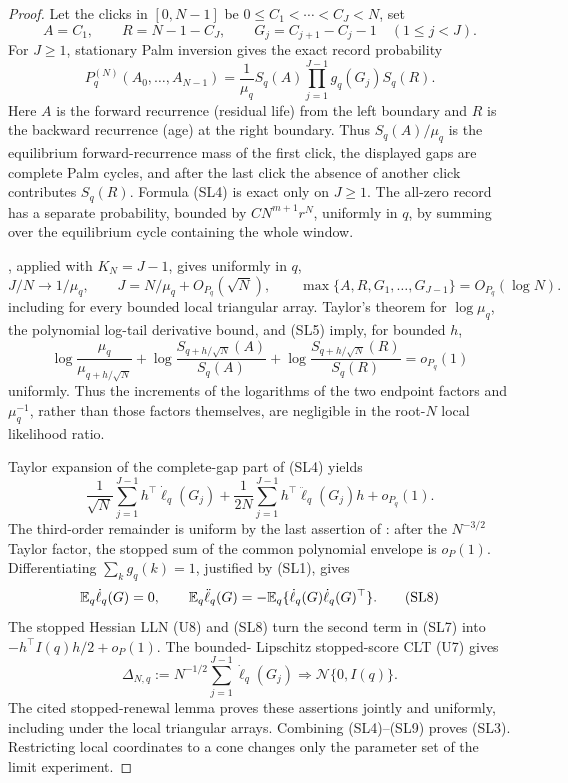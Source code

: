 \begin{proof}
Let the clicks in \([0,N-1]\) be
\(0\le C_1<\cdots<C_J<N\), set
\[
 A=C_1,\qquad R=N-1-C_J,
 \qquad G_j=C_{j+1}-C_j-1\quad(1\le j<J).
\]
For \(J\ge1\), stationary Palm inversion gives the exact record probability
\[
 P_q^{(N)}(A_0,\ldots,A_{N-1})
 =\frac1{\mu_q}S_q(A)
   \prod_{j=1}^{J-1}g_q(G_j)S_q(R).
\tag{SL4}
\]
Here \(A\) is the forward recurrence (residual life) from the left boundary
and \(R\) is the backward recurrence (age) at the right boundary.  Thus
\(S_q(A)/\mu_q\) is the equilibrium forward-recurrence mass of the first
click, the displayed gaps are complete Palm cycles, and after the last click
the absence of another click contributes \(S_q(R)\).  Formula
\textup{(SL4)} is exact only on \(J\ge1\).  The all-zero record has a separate
probability, bounded by \(CN^{m+1}r^N\), uniformly in \(q\), by summing over
the equilibrium cycle containing the whole window.

, applied with
\(K_N=J-1\), gives uniformly in \(q\),
\[
 J/N\longrightarrow1/\mu_q,\qquad
 J=N/\mu_q+O_{P_q}(\sqrt N),\qquad
 \max\{A,R,G_1,\ldots,G_{J-1}\}=O_{P_q}(\log N).
\tag{SL5}
\]
including for every bounded local triangular array.  Taylor's theorem for
\(\log\mu_q\), the polynomial log-tail derivative bound, and
\textup{(SL5)} imply, for bounded \(h\),
\[
 \log\frac{\mu_q}{\mu_{q+h/\sqrt N}}
 +\log\frac{S_{q+h/\sqrt N}(A)}{S_q(A)}
 +\log\frac{S_{q+h/\sqrt N}(R)}{S_q(R)}=o_{P_q}(1)
\tag{SL6}
\]
uniformly.  Thus the increments of the logarithms of the two endpoint factors
and \(\mu_q^{-1}\), rather than those factors themselves, are negligible in
the root-\(N\) local likelihood ratio.

Taylor expansion of the complete-gap part of \textup{(SL4)} yields
\[
 \frac1{\sqrt N}\sum_{j=1}^{J-1}h^\top\dot\ell_q(G_j)
 +\frac1{2N}\sum_{j=1}^{J-1}
 h^\top\ddot\ell_q(G_j)h+o_{P_q}(1).
\tag{SL7}
\]
The third-order remainder is uniform by the last assertion of
: after the \(N^{-3/2}\)
Taylor factor, the stopped sum of the common polynomial envelope is
\(o_P(1)\).
Differentiating \(\sum_kg_q(k)=1\), justified by \textup{(SL1)}, gives
\[
 \mathbb{E}_q\dot\ell_q(G)=0,\qquad
 \mathbb{E}_q\ddot\ell_q(G)=-\mathbb{E}_q\{
 \dot\ell_q(G)\dot\ell_q(G)^\top\}.
\tag{SL8}
\]
The stopped Hessian LLN \textup{(U8)} and \textup{(SL8)} turn the second
term in \textup{(SL7)} into \(-h^\top I(q)h/2+o_P(1)\).  The bounded-
Lipschitz stopped-score CLT \textup{(U7)} gives
\[
 \Delta_{N,q}:=N^{-1/2}\sum_{j=1}^{J-1}\dot\ell_q(G_j)
 \Rightarrow\mathcal N\{0,I(q)\}.
\tag{SL9}
\]
The cited stopped-renewal lemma proves these assertions jointly and uniformly,
including under the local triangular arrays.  Combining
\textup{(SL4)}--\textup{(SL9)} proves \textup{(SL3)}.  Restricting local
coordinates to a cone changes only the parameter set of the limit experiment.
\end{proof}


